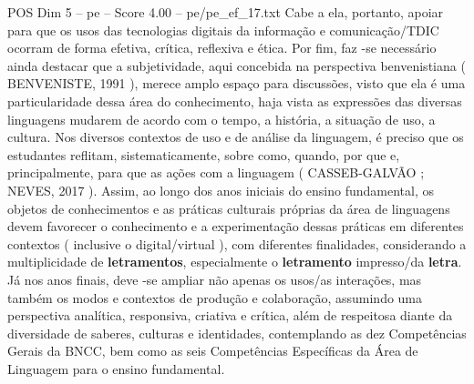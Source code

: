 \begin{textsample}{POS Dim 5 – pe – Score 4.00 – pe/pe\_ef\_17.txt}
Cabe a ela, portanto, apoiar para que os usos das tecnologias digitais da informação e comunicação/TDIC ocorram de forma efetiva, crítica, reflexiva e ética.
Por fim, faz -se necessário ainda destacar que a subjetividade, aqui concebida na perspectiva benvenistiana ( BENVENISTE, 1991 ), merece amplo espaço para discussões, visto que ela é uma particularidade dessa área do conhecimento, haja vista as expressões das diversas linguagens mudarem de acordo com o tempo, a história, a situação de uso, a cultura.
Nos diversos contextos de uso e de análise da linguagem, é preciso que os estudantes reflitam, sistematicamente, sobre como, quando, por que e, principalmente, para que as ações com a linguagem ( CASSEB-GALVÃO ; NEVES, 2017 ).
Assim, ao longo dos anos iniciais do ensino fundamental, os objetos de conhecimentos e as práticas culturais próprias da área de linguagens devem favorecer o conhecimento e a experimentação dessas práticas em diferentes contextos ( inclusive o digital/virtual ), com diferentes finalidades, considerando a multiplicidade de \textbf{letramentos}, especialmente o \textbf{letramento} impresso/da \textbf{letra}.
Já nos anos finais, deve -se ampliar não apenas os usos/as interações, mas também os modos e contextos de produção e colaboração, assumindo uma perspectiva analítica, responsiva, criativa e crítica, além de respeitosa diante da diversidade de saberes, culturas e identidades, contemplando as dez Competências Gerais da BNCC, bem como as seis Competências Específicas da Área de Linguagem para o ensino fundamental.

\end{textsample}
